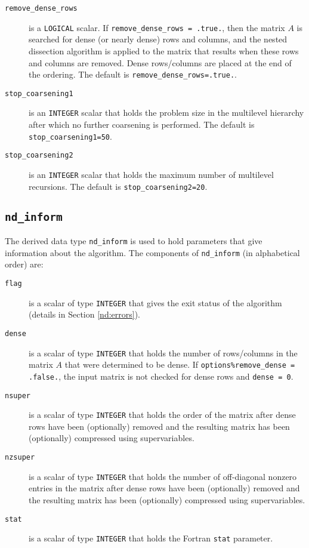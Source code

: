 \begin{description}
\item[\texttt{remove\_dense\_rows}] is a {\tt LOGICAL} scalar. If {\tt remove\_dense\_rows = .true.}, 
then the matrix $A$ is searched for dense (or nearly dense) rows and columns, 
and the nested dissection algorithm is applied to the matrix that results when 
these rows and columns are removed. Dense rows/columns are placed at the end of 
the ordering. The default is {\tt remove\_dense\_rows=.true.}.



\item[\texttt{stop\_coarsening1}] is an {\tt INTEGER} scalar that holds the problem size in the multilevel hierarchy after which no further coarsening is performed.
The default is {\tt stop\_coarsening1=50}.

\item[\texttt{stop\_coarsening2}] is an {\tt INTEGER} scalar that holds the maximum number
of multilevel recursions.  
The default is {\tt stop\_coarsening2=20}.

\end{description}




\subsection{\texttt{nd\_inform}}
\label{nd:type:inform}
The derived data type {\tt nd\_inform}
is used to hold parameters that give information about the algorithm. The 
components of {\tt nd\_inform}
(in alphabetical order) are:

\begin{description}

\item[\texttt{flag}] is a scalar of type  {\tt INTEGER}
that gives the exit status of the algorithm (details in Section \ref{nd:errors}).

\item[\texttt{dense}] is a scalar of type {\tt INTEGER} that holds 
the number of rows/columns in the matrix $A$ that were determined to be dense. 
If {\tt options\%remove\_dense = .false.}, the input matrix is not checked for 
dense rows and {\tt dense = 0}.

\item[\texttt{nsuper}] is a scalar of type {\tt INTEGER} that holds the order 
of the matrix after dense rows have been (optionally) removed and 
the resulting matrix has been (optionally) compressed using supervariables. 

\item[\texttt{nzsuper}] is a scalar of type {\tt INTEGER} that holds the number of 
off-diagonal nonzero entries in the matrix after dense rows have been 
(optionally) removed and the resulting matrix has been (optionally) compressed 
using supervariables. 

\item[\texttt{stat}] is a scalar of type  {\tt INTEGER}
that holds the Fortran {\tt stat} parameter. 


\end{description}


